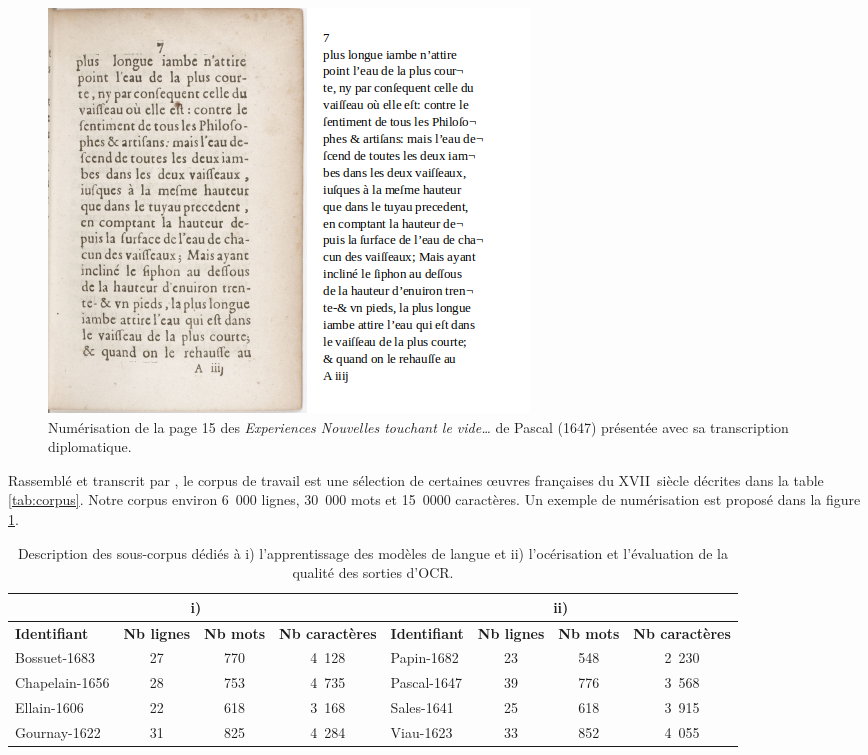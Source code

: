 \documentclass[10pt,twoside]{article}
\begin{document}
    \begin{figure}[htbp] 
    \begin{center} 
    \includegraphics[scale=0.5]{pascal_15_img_transcription.png}
    \end{center} 
    \caption{Numérisation de la page 15 des \textit{Experiences Nouvelles touchant le vide…} de Pascal (1647) 
    présentée avec sa transcription diplomatique.} \label{pascal}
    \end{figure}

    Rassemblé et transcrit par \cite{Gabay2019a},
    le corpus de travail est une sélection de certaines \oe{}uvres françaises du XVII\ieme~siècle 
    décrites dans la table \ref{tab:corpus}. Notre corpus environ 6~000 lignes, 30~000 mots et 15~0000 caractères. 
    Un exemple de numérisation est proposé dans la figure \ref{pascal}.

    \begin{table}[h]
    \begin{center}
    \begin{footnotesize}
    {\setlength{\tabcolsep}{0.1cm}
    \begin{tabular}{|l|c|c|c|l|c|c|c|}
    \hline
    \multicolumn{4}{|c}{i)}&\multicolumn{4}{|c|}{ii)}\\\hline
    \textbf{Identifiant}&\textbf{Nb lignes}&\textbf{Nb mots}&\textbf{Nb caractères}&\textbf{Identifiant}&\textbf{Nb lignes}&\textbf{Nb mots}&\textbf{Nb caractères}\\ \hline
    Bossuet-1683&27&770&4~128&Papin-1682&23&548&2~230\\ \hline
    Chapelain-1656&28&753&4~735&Pascal-1647&39&776&3~568\\ \hline
    Ellain-1606&22&618&3~168&Sales-1641&25&618&3~915\\ \hline
    Gournay-1622&31&825&4~284&Viau-1623&33&852&4~055\\\hline
    \end{tabular}}
    \caption{Description des sous-corpus dédiés à i) l'apprentissage des modèles de langue et ii) l'océrisation
    et l'évaluation de la qualité des sorties d'OCR.} \label{tab:souscorpus}
    \end{footnotesize}
    \end{center}
    \end{table} 
\end{document}
